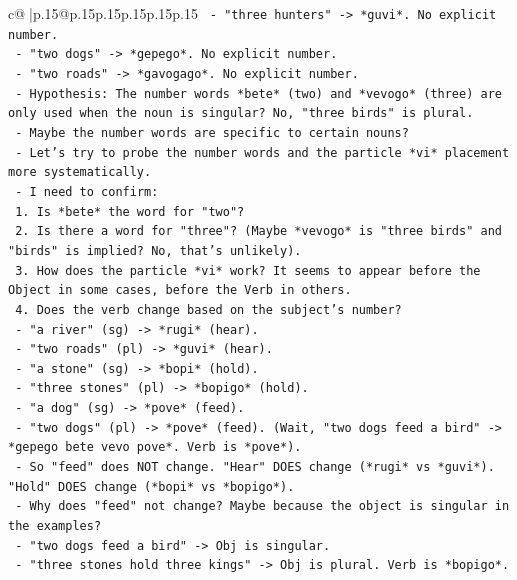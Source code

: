 \documentclass{article}
\begin{document}
{\begin{supertabular}{c@{$\;$}|p{.15\linewidth}@{}p{.15\linewidth}p{.15\linewidth}p{.15\linewidth}p{.15\linewidth}p{.15\linewidth}}
{{{\texttt{       {-} "three hunters" {-}> *guvi*. No explicit number.} \\
\texttt{       {-} "two dogs" {-}> *gepego*. No explicit number.} \\
\texttt{       {-} "two roads" {-}> *gavogago*. No explicit number.} \\
\texttt{     {-} Hypothesis: The number words *bete* (two) and *vevogo* (three) are only used when the noun is singular? No, "three birds" is plural.} \\
\texttt{     {-} Maybe the number words are specific to certain nouns?} \\
\texttt{     {-} Let's try to probe the number words and the particle *vi* placement more systematically.} \\
\texttt{     {-} I need to confirm:} \\
\texttt{       1. Is *bete* the word for "two"?} \\
\texttt{       2. Is there a word for "three"? (Maybe *vevogo* is "three birds" and "birds" is implied? No, that's unlikely).} \\
\texttt{       3. How does the particle *vi* work? It seems to appear before the Object in some cases, before the Verb in others.} \\
\texttt{       4. Does the verb change based on the subject's number?} \\
\texttt{          {-} "a river" (sg) {-}> *rugi* (hear).} \\
\texttt{          {-} "two roads" (pl) {-}> *guvi* (hear).} \\
\texttt{          {-} "a stone" (sg) {-}> *bopi* (hold).} \\
\texttt{          {-} "three stones" (pl) {-}> *bopigo* (hold).} \\
\texttt{          {-} "a dog" (sg) {-}> *pove* (feed).} \\
\texttt{          {-} "two dogs" (pl) {-}> *pove* (feed). (Wait, "two dogs feed a bird" {-}> *gepego bete vevo pove*. Verb is *pove*).} \\
\texttt{          {-} So "feed" does NOT change. "Hear" DOES change (*rugi* vs *guvi*). "Hold" DOES change (*bopi* vs *bopigo*).} \\
\texttt{          {-} Why does "feed" not change? Maybe because the object is singular in the examples?} \\
\texttt{          {-} "two dogs feed a bird" {-}> Obj is singular.} \\
\texttt{          {-} "three stones hold three kings" {-}> Obj is plural. Verb is *bopigo*.} \\
}}}
\end{supertabular}}
\end{document}
